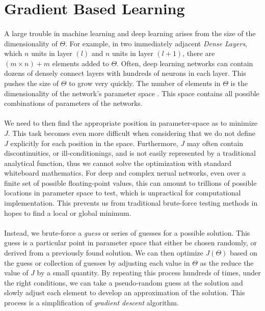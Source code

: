 \documentclass[12pt,letterpaper]{article}
\begin{document}

\section{Gradient Based Learning}

\paragraph*{}A large trouble in machine learning and deep learning arises from the size of the dimensionality of $\Theta$. For example, in two immediately adjacent \textit{Dense Layers}, which $n$ units in layer $(l)$ and $n$ units in layer $(l+1)$, there are $(m \times n) + m$ elements added to $\Theta$. Often, deep learning networks can contain dozens of densely connect layers with hundreds of neurons in each layer. This pushes the size of $\Theta$ to grow very quickly. The number of elements in $\Theta$ is the dimensionality of the network's parameter space \cite{Goodfellow}. This space contains all possible combinations of parameters of the networks.

\paragraph*{}We need to then find the appropriate position in parameter-space as to minimize $J$. This task becomes even more difficult when considering that we do not define $J$ explicitly for each position in the space. Furthermore, $J$ may often contain discontinuities, or ill-conditionings, and is not easily represented by a traditional analytical function, thus we cannot solve the optimization with standard whiteboard mathematics. For deep and complex nerual networks, even over a finite set of possible floating-point values, this can amount to trillions of possible locations in parameter space to test, which is unpractical for computational implementation. This prevents us from traditional brute-force testing methods in hopes to find a local or global minimum. 

\paragraph*{}Instead, we brute-force a \textit{guess} or series of guesses for a possible solution. This guess is a particular point in parameter space that either be chosen randomly, or derived from a previously found solution. We can then optimize $J(\Theta)$ based on the guess or collection of guesses by adjusting each value in $\Theta$ as the reduce the value of $J$ by a small quantity. By repeating this process hundreds of times, under the right conditions, we can take a pseudo-random guess at the solution and slowly adjust each element to develop an approximation of the solution. This process is a simplification of \textit{gradient descent} algorithm.
\end{document}
